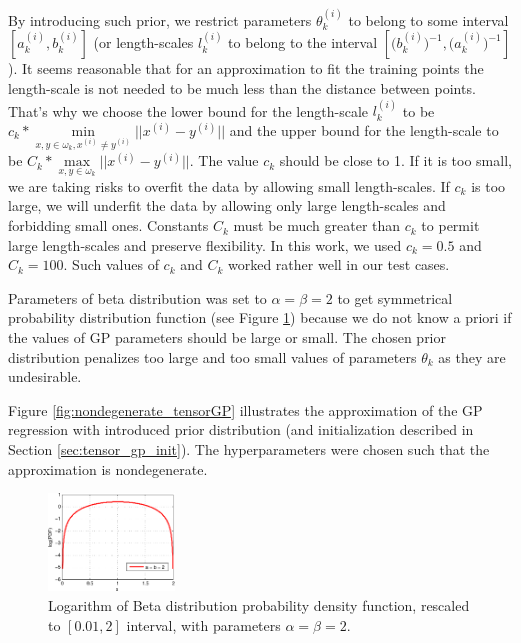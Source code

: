 By introducing such prior, we restrict parameters $\theta_k^{(i)}$ to belong
to some interval $\left [a_k^{(i)}, b_k^{(i)} \right ]$ (or length-scales $l_k^{(i)}$ to belong to the interval
$\left [\big (b_k^{(i)} \big)^{-1}, \big (a_k^{(i)} \big )^{-1} \right ]$).
It seems reasonable that for an approximation to fit the training points
the length-scale is not needed to be much less than the distance between points.
That's why we choose the lower bound for the length-scale $l_k^{(i)}$ to be $c_k * \min\limits_{x, y \in \omega_k, x^{(i)} \ne y^{(i)}} ||x^{(i)} - y^{(i)}||$
and the upper bound for the length-scale to be ${C_k * \max\limits_{x, y \in \omega_k} ||x^{(i)} - y^{(i)}||}$.
The value $c_k$ should be close to 1.
If it is too small, we are taking risks to overfit the data by allowing small length-scales.
If $c_k$ is too large, we will underfit the data by allowing only large length-scales and forbidding small ones.
Constants $C_k$ must be much greater than $c_k$ to permit large length-scales and preserve flexibility.
In this work, we used $c_k = 0.5$ and $C_k = 100$.
Such values of $c_k$ and $C_k$ worked rather well in our test cases.

Parameters of beta distribution was set to $\alpha = \beta = 2$ to get
symmetrical probability distribution function (see Figure \ref{fig:beta}) because
we do not know a priori if the values of GP parameters should be large or small.
The chosen prior distribution penalizes too large and too small values of parameters $\theta_k$
as they are undesirable.

Figure \ref{fig:nondegenerate_tensorGP} illustrates the approximation
of the GP regression with introduced prior distribution (and initialization described in Section \ref{sec:tensor_gp_init}).
The hyperparameters were chosen such that the approximation
is nondegenerate.

\begin{figure}
  \centering
  \includegraphics[width=0.3\textwidth]{figures/gp_on_grid/beta.pdf}
  \caption{Logarithm of Beta distribution probability density function, rescaled to $[0.01, 2]$ interval,
    with parameters $\alpha = \beta = 2$.}
  \label{fig:beta}
\end{figure}


